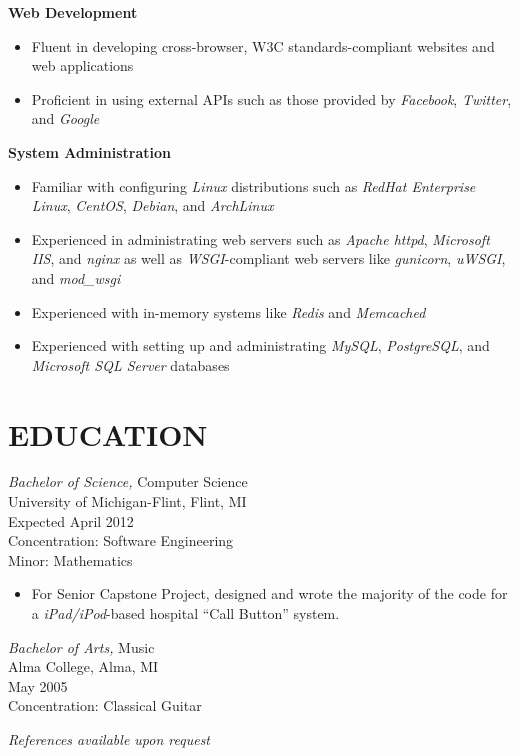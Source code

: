 \documentclass[line,margin]{res}
\begin{document}
\begin{resume}
\textbf{Web Development}
\vspace{2 mm}
\begin{itemize}
\item Fluent in developing cross-browser, W3C standards-compliant websites
and web applications
\item Proficient in using external APIs such as those provided by {\sl Facebook},
{\sl Twitter}, and {\sl Google}
\end{itemize}

\textbf{System Administration}
\vspace{2 mm}
\begin{itemize}
\item Familiar with configuring {\sl Linux} distributions such as {\sl RedHat
    Enterprise Linux}, {\sl CentOS}, {\sl Debian}, and {\sl ArchLinux}
    \item Experienced in administrating web servers such as {\sl Apache httpd},
{\sl Microsoft IIS}, and {\sl nginx} as well as
{\sl WSGI}-compliant web servers like {\sl gunicorn},
{\sl uWSGI}, and {\sl mod\_wsgi}
\item Experienced with in-memory systems like {\sl Redis} and {\sl Memcached}
\item Experienced with setting up and administrating {\sl MySQL},
{\sl PostgreSQL}, and {\sl Microsoft SQL Server} databases
\end{itemize}

\section{EDUCATION} {\sl Bachelor of Science,} Computer Science \\
                University of Michigan-Flint, Flint, MI \\
                Expected April 2012 \\
                Concentration: Software Engineering \\
                Minor: Mathematics
                \vspace{2 mm}
                \begin{itemize}
                    \item For Senior Capstone Project, designed and wrote 
                            the majority of the code for a
                            {\sl iPad/iPod}-based hospital ``Call Button''
                            system.
                \end{itemize}

                {\sl Bachelor of Arts,} Music \\
                Alma College, Alma, MI \\
                May 2005 \\
                Concentration: Classical Guitar

\vspace{30 mm}


\end{resume}

\begin{flushleft}
{\sl References available upon request}
\end{flushleft}
\end{document}
